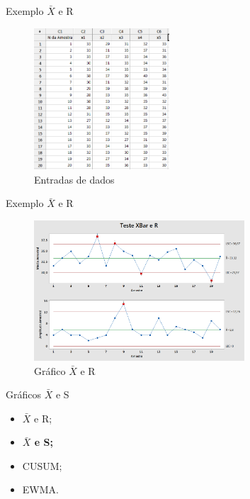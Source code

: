 \documentclass[12pt]{beamer}
\begin{document}
  \begin{frame}[t]{Exemplo $\bar X$ e R}
    \begin{figure}[ht]
      \includegraphics[width=0.45\textwidth]{img/Tabela}
      \caption{Entradas de dados}
    \end{figure}
  \end{frame}

  \begin{frame}[t]{Exemplo $\bar X$ e R}
    \begin{figure}[ht]
      \includegraphics[width=0.7\textwidth]{img/testeR}
      \caption{Gráfico $\bar X$ e R}
    \end{figure}
  \end{frame}


  \begin{frame}[t]{Gráficos $\bar X$ e S}
    \begin{itemize}
      \item $\bar X$ e R;

      \item \textbf{$\bar X$ e S;}

      \item CUSUM;

      \item EWMA.
    \end{itemize}
  \end{frame}
\end{document}
